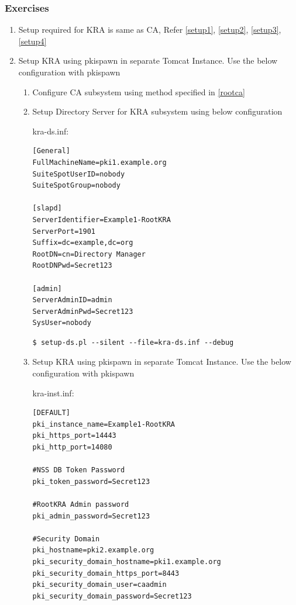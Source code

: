\documentclass[12pt]{report}
\begin{document}
\subsubsection{Exercises}
    \begin{enumerate}[label*=\arabic*.]
        \item Setup required for KRA is same as CA, Refer \ref{setup1}, \ref{setup2}, \ref{setup3}, \ref{setup4}
        \item Setup KRA using pkispawn in separate Tomcat Instance. Use the below configuration with pkispawn
            \begin{enumerate}[label*=\arabic*.]
                \item Configure CA subsystem using method specified in \ref{rootca}
                \item Setup Directory Server for KRA subsystem using below configuration 

                    kra-ds.inf:
                    \begin{lstlisting}[style=configFile]
[General]
FullMachineName=pki1.example.org
SuiteSpotUserID=nobody
SuiteSpotGroup=nobody

[slapd]
ServerIdentifier=Example1-RootKRA
ServerPort=1901
Suffix=dc=example,dc=org
RootDN=cn=Directory Manager
RootDNPwd=Secret123

[admin]
ServerAdminID=admin
ServerAdminPwd=Secret123
SysUser=nobody
                    \end{lstlisting}
                    \begin{lstlisting}[style=bashInputStyle]
$ setup-ds.pl --silent --file=kra-ds.inf --debug            
                    \end{lstlisting}
                \item \label{kra_sep_tomcat} Setup KRA using pkispawn in separate Tomcat Instance. Use the below configuration with pkispawn
                    
                    kra-inst.inf:
                    \begin{lstlisting}[style=configFile]
[DEFAULT]
pki_instance_name=Example1-RootKRA
pki_https_port=14443
pki_http_port=14080

#NSS DB Token Password
pki_token_password=Secret123

#RootKRA Admin password
pki_admin_password=Secret123

#Security Domain
pki_hostname=pki2.example.org
pki_security_domain_hostname=pki1.example.org
pki_security_domain_https_port=8443
pki_security_domain_user=caadmin
pki_security_domain_password=Secret123


\end{lstlisting}
\end{enumerate}
\end{enumerate}
\end{document}
